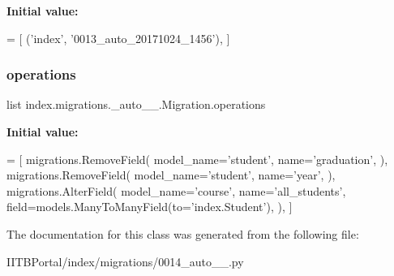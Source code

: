 {\bfseries Initial value\+:}
\begin{DoxyCode}
=  [
        (\textcolor{stringliteral}{'index'}, \textcolor{stringliteral}{'0013\_auto\_20171024\_1456'}),
    ]
\end{DoxyCode}
\mbox{\label{classindex_1_1migrations_1_10014__auto__20171024__1456_1_1Migration_a36ef55b6209e47febb8ff51b7897281a}} 
\subsubsection{\texorpdfstring{operations}{operations}}
{\footnotesize\ttfamily list index.\+migrations.\+\_\+auto\+\_\+\_.\+Migration.\+operations\hspace{0.3cm}{\ttfamily [static]}}

{\bfseries Initial value\+:}
\begin{DoxyCode}
=  [
        migrations.RemoveField(
            model\_name=\textcolor{stringliteral}{'student'},
            name=\textcolor{stringliteral}{'graduation'},
        ),
        migrations.RemoveField(
            model\_name=\textcolor{stringliteral}{'student'},
            name=\textcolor{stringliteral}{'year'},
        ),
        migrations.AlterField(
            model\_name=\textcolor{stringliteral}{'course'},
            name=\textcolor{stringliteral}{'all\_students'},
            field=models.ManyToManyField(to=\textcolor{stringliteral}{'index.Student'}),
        ),
    ]
\end{DoxyCode}


The documentation for this class was generated from the following file\+:\begin{DoxyCompactItemize}
\item 
I\+I\+T\+B\+Portal/index/migrations/0014\+\_\+auto\+\_\+\_.\+py\end{DoxyCompactItemize}
